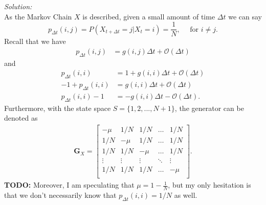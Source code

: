 \documentclass[10pt]{amsart}
\begin{document}
\noindent
\textit{Solution:} \\
As the Markov Chain $X$ is described, given a small amount of time $\Delta t$ we can say 
$$
p_{\Delta t}(i,j) = P(X_{t + \Delta t} = j | X_t = i) = \frac 1 N, \quad \text{ for } i \neq j.
$$
Recall that we have
\begin{align*}
p_{\Delta t}(i, j) &= g(i, j) \Delta t + \mathcal O(\Delta t)
\end{align*}
and
\begin{align*}
p_{\Delta t}(i, i) &= 1 + g(i, i) \Delta t + \mathcal O(\Delta t) \\
- 1 + p_{\Delta t}(i, i) &= g(i, i) \Delta t + \mathcal O(\Delta t) \\
p_{\Delta t}(i, i) - 1 &= - g(i, i) \Delta t - \mathcal O(\Delta t).
\end{align*}
Furthermore, with the state space $S = \{1, 2, ..., N + 1\}$, the generator can be denoted as
\begin{align*}
\bm G_X = 
\begin{bmatrix}
- \mu & 1/N & 1/N & \dots & 1/N \\
1/N & - \mu & 1/N & \dots & 1/N \\
1/N & 1/N & - \mu & \dots & 1/N \\
\vdots & \vdots & \vdots & \ddots & \vdots \\
1/N & 1/N & 1/N & \dots & - \mu \\
\end{bmatrix}.
\end{align*}
\textbf{TODO:}
Moreover, I am speculating that $\mu = 1 - \frac 1 N$, but my only hesitation is that we don't necessarily know that $p_{\Delta t}(i,i) = 1/N$ as well.
\\
\end{document}

